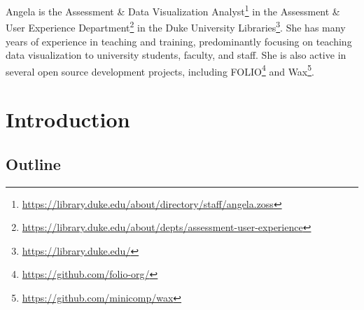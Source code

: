 \documentclass[
]{krantz}
\renewcommand{\href}[2]{#2\footnote{\url{#1}}}
\begin{document}
Angela is the \href{https://library.duke.edu/about/directory/staff/angela.zoss}{Assessment \& Data Visualization Analyst} in the \href{https://library.duke.edu/about/depts/assessment-user-experience}{Assessment \& User Experience Department} in the \href{https://library.duke.edu/}{Duke University Libraries}. She has many years of experience in teaching and training, predominantly focusing on teaching data visualization to university students, faculty, and staff. She is also active in several open source development projects, including \href{https://github.com/folio-org/}{FOLIO} and \href{https://github.com/minicomp/wax}{Wax}.

\hypertarget{introduction}{%
\chapter*{Introduction}\label{introduction}}


\hypertarget{outline}{%
\section*{Outline}\label{outline}}
\end{document}
